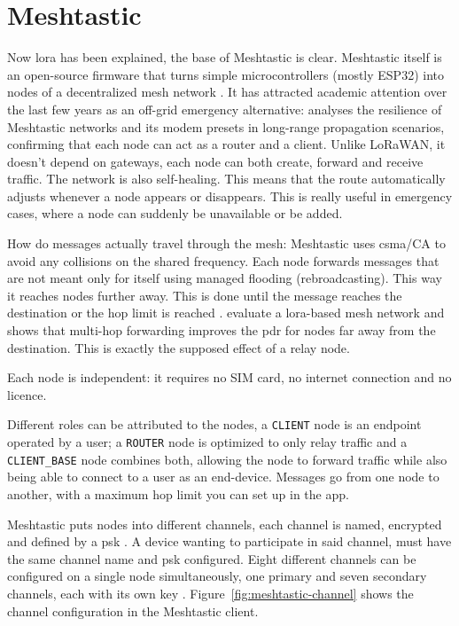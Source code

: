 \section{Meshtastic}%
\label{sec:sota-meshtastic}

Now \gls{lora} has been explained, the base of Meshtastic is clear. Meshtastic itself is an open-source firmware that turns simple microcontrollers (mostly ESP32) into nodes of a decentralized mesh network \autocite{MeshtasticDocs}.
It has attracted academic attention over the last few years as an off-grid emergency alternative: \textcite{SepulvedaMeshtastic2026} analyses the resilience of Meshtastic networks and its modem presets in long-range propagation scenarios, confirming that each node can act as a router and a client. Unlike LoRaWAN, it doesn't depend on gateways, each node can both create, forward and receive traffic.
The network is also self-healing. This means that the route automatically adjusts whenever a node appears or disappears. This is really useful in emergency cases, where a node can suddenly be unavailable or be added.

How do messages actually travel through the mesh: Meshtastic uses \gls{csma}/CA to avoid any collisions on the shared frequency. Each node forwards messages that are not meant only for itself using managed flooding (rebroadcasting). This way it reaches nodes further away.
This is done until the message reaches the destination or the hop limit is reached \autocite{Durand2025MeshLoRa}.
\textcite{Durand2025MeshLoRa} evaluate a \gls{lora}-based mesh network and shows that multi-hop forwarding improves the \gls{pdr} for nodes far away from the destination. This is exactly the supposed effect of a relay node.

Each node is independent: it requires no SIM card, no internet connection and no licence.

Different roles can be attributed to the nodes, a \texttt{CLIENT} node is an endpoint operated by a user; a \texttt{ROUTER} node is optimized to only relay traffic and a \texttt{CLIENT\_BASE} node combines both, allowing the node to forward traffic while also being able to connect to a user as an end-device.
Messages go from one node to another, with a maximum hop limit you can set up in the app.

Meshtastic puts nodes into different channels, each channel is named, encrypted and defined by a \gls{psk} \autocite{MeshtasticChannels}.
A device wanting to participate in said channel, must have the same channel name and \gls{psk} configured. Eight different channels can be configured on a single node simultaneously, one primary and seven secondary channels, each with its own key \autocite{MeshtasticChannels}.
Figure~\ref{fig:meshtastic-channel} shows the channel configuration in the Meshtastic client.

